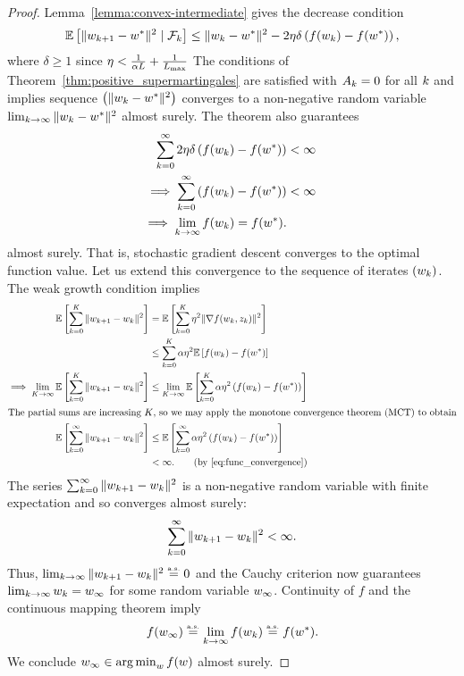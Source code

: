 \wgcAlmostSure*
\begin{proof}
    Lemma~\ref{lemma:convex-intermediate} gives the decrease condition
    \begin{align*}
        \mathbb{E}\left[\|w_{k+1} - w^*\|^2 \mid \mathcal{F}_k\right] \leq  \|w_k - w^*\|^2 - 2 \eta \delta \left(f(w_k) - f(w^*)\right),
    \end{align*}
    where \( \delta \geq 1 \) since \( \eta < \frac{1}{\alpha L} + \frac{1}{L_{\text{max}}} \)
    The conditions of Theorem~\ref{thm:positive_supermartingales} are satisfied with \( A_k = 0 \) for all \( k \) and implies sequence \( \left(\|w_k - w^*\|^2\right) \) converges to a non-negative random variable \(\lim_{k \rightarrow \infty} \|w_k - w^*\|^2 \) almost surely.
    The theorem also guarantees
    \begin{align}
        \sum_{k=0}^{\infty} 2\eta \delta \left(f(w_k) - f(w^*)\right) &< \infty \nonumber \\
        \implies \sum_{k=0}^{\infty} \left(f(w_k) - f(w^*)\right) &< \infty~\label{eq:func_convergence}\\
        \implies \lim_{k \rightarrow \infty} f(w_k) = f(w^*). \nonumber
    \end{align}
    almost surely.
    That is, stochastic gradient descent converges to the optimal function value. 
    Let us extend this convergence to the sequence of iterates \( \left(w_k\right) \).
    The weak growth condition implies 
    \begin{align*}
        \E\sbr{\sum_{k=0}^{K} \norm{\wkk - \wk}^2} &= \E\sbr{\sum_{k=0}^{K} \eta^2 \norm{\grad(\wk, \zk)}^2}\\
                                                   &\leq \sum_{k=0}^{K} \wgc \eta^2 \E\sbr{f(\wk) - f(\wopt)}\\
        \implies \lim_{K\rightarrow \infty} \E \sbr{\sum_{k=0}^{K} \norm{\wkk - \wk}^2} &\leq \lim_{K\rightarrow\infty} \E \sbr{\sum_{k=0}^{K} \wgc \eta^2 \rbr{f(\wk) - f(\wopt)}}\\
        \intertext{The partial sums are increasing \( K \), so we may apply the monotone convergence theorem (MCT) to obtain} 
        \E \sbr{\sum_{k=0}^{\infty} \norm{\wkk - \wk}^2} &\leq  \E \sbr{\sum_{k=0}^{\infty} \wgc \eta^2 \rbr{f(\wk) - f(\wopt)}}\\
                                                                  &< \infty. \tag{by \autoref{eq:func_convergence}}
    \end{align*}
    The series \(  \sum_{k=0}^{\infty} \|w_{k+1} - w_k\|^2 \) is a non-negative random variable with finite expectation and so converges almost surely: 
    \[ \sum_{k=0}^{\infty} \|w_{k+1} - w_k\|^2 < \infty. \]
    Thus, \( \lim_{k \rightarrow \infty} \|w_{k+1} - w_k\|^2 \stackrel{\text{\rm\tiny a.s.}}{=} 0 \) and the Cauchy criterion now guarantees \( \lim_{k \rightarrow \infty} w_k = w_\infty \) for some random variable \( w_\infty \).
    Continuity of \( f \) and the continuous mapping theorem imply 
    \[ f(w_\infty) \stackrel{\text{\rm\tiny a.s.}}{=} \lim_{k\rightarrow \infty} f(w_k) \stackrel{\text{\rm\tiny a.s.}}{=} f(w^*). \]
    We conclude \( w_\infty \in \mathop{\rm arg\,min}_w f(w) \) almost surely.
\end{proof}

